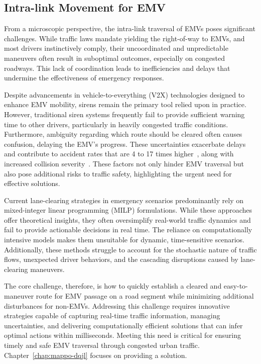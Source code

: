 \subsection{Intra-link Movement for EMV}

From a microscopic perspective, the intra-link traversal of EMVs poses significant challenges. While traffic laws mandate yielding the right-of-way to EMVs, and most drivers instinctively comply, their uncoordinated and unpredictable maneuvers often result in suboptimal outcomes, especially on congested roadways. This lack of coordination leads to inefficiencies and delays that undermine the effectiveness of emergency responses.

Despite advancements in vehicle-to-everything (V2X) technologies designed to enhance EMV mobility, sirens remain the primary tool relied upon in practice. However, traditional siren systems frequently fail to provide sufficient warning time to other drivers, particularly in heavily congested traffic conditions. Furthermore, ambiguity regarding which route should be cleared often causes confusion, delaying the EMV's progress. These uncertainties exacerbate delays and contribute to accident rates that are 4 to 17 times higher~\cite{Buchenscheit2009AVE}, along with increased collision severity~\cite{Yasmin2012Effects}. These factors not only hinder EMV traversal but also pose additional risks to traffic safety, highlighting the urgent need for effective solutions.

Current lane-clearing strategies in emergency scenarios predominantly rely on mixed-integer linear programming (MILP) formulations. While these approaches offer theoretical insights, they often oversimplify real-world traffic dynamics and fail to provide actionable decisions in real time. The reliance on computationally intensive models makes them unsuitable for dynamic, time-sensitive scenarios. Additionally, these methods struggle to account for the stochastic nature of traffic flows, unexpected driver behaviors, and the cascading disruptions caused by lane-clearing maneuvers.

The core challenge, therefore, is how to quickly establish a cleared and easy-to-maneuver route for EMV passage on a road segment while minimizing additional disturbances for non-EMVs. Addressing this challenge requires innovative strategies capable of capturing real-time traffic information, managing uncertainties, and delivering computationally efficient solutions that can infer optimal actions within milliseconds. Meeting this need is critical for ensuring timely and safe EMV traversal through congested urban traffic. Chapter~\ref{chap:mappo-dqjl} focuses on providing a solution.

